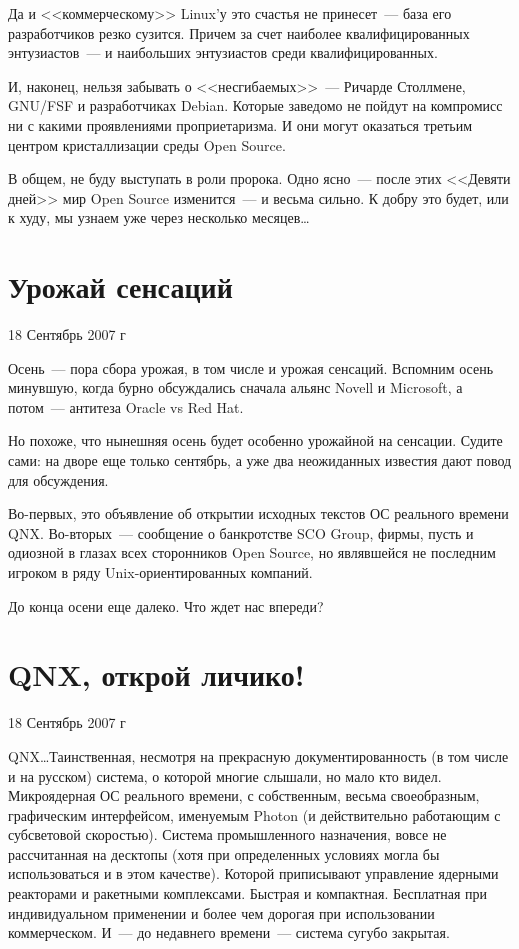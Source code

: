 Да и <<коммерческому>> Linux'у это счастья не принесет~--- база его разработчиков резко сузится. Причем за счет наиболее квалифицированных энтузиастов~--- и наибольших энтузиастов среди квалифицированных.

И, наконец, нельзя забывать о <<несгибаемых>>~--- Ричарде Столлмене, GNU/FSF и разработчиках Debian. Которые заведомо не пойдут на компромисс ни с какими проявлениями проприетаризма. И они могут оказаться третьим центром кристаллизации среды Open Source.

В общем, не буду выступать в роли пророка. Одно ясно~--- после этих <<Девяти дней>> мир Open Source изменится~--- и весьма сильно. К добру это будет, или к худу, мы узнаем уже через несколько месяцев\dots

\section{Урожай сенсаций} 
\begin{timeline}18 Сентябрь 2007 г\end{timeline}

Осень~--- пора сбора урожая, в том числе и урожая сенсаций. Вспомним осень минувшую, когда бурно обсуждались сначала альянс Novell и Microsoft, а потом~--- антитеза Oracle vs Red Hat.

Но похоже, что нынешняя осень будет особенно урожайной на сенсации. Судите сами: на дворе еще только сентябрь, а уже два неожиданных известия дают повод для обсуждения.

Во-первых, это объявление об открытии исходных текстов ОС реального времени QNX. Во-вторых~--- сообщение о банкротстве SCO Group, фирмы, пусть и одиозной в глазах всех сторонников Open Source, но являвшейся не последним игроком в ряду Unix-ориентированных компаний.

До конца осени еще далеко. Что ждет нас впереди?

\section{QNX, открой личико!} 
\begin{timeline}18 Сентябрь 2007 г\end{timeline}
QNX\dots Таинственная, несмотря на прекрасную документированность (в том числе и на русском) система, о которой многие слышали, но мало кто видел. Микроядерная ОС реального времени, с собственным, весьма своеобразным, графическим интерфейсом, именуемым Photon (и действительно работающим с субсветовой скоростью). Система промышленного назначения, вовсе не рассчитанная на десктопы (хотя при определенных условиях могла бы использоваться и в этом качестве). Которой приписывают управление ядерными реакторами и ракетными комплексами. Быстрая и компактная. Бесплатная при индивидуальном применении и более чем дорогая при использовании коммерческом. И~--- до недавнего времени~--- система сугубо закрытая.

